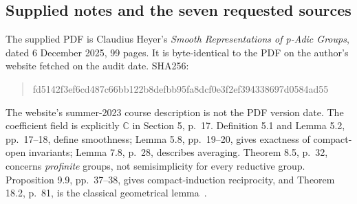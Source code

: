 \documentclass[11pt]{article}
\theoremstyle{remark}\newtheorem{remark}[definition]{Remark}
\newcommand{\C}{\mathbb{C}}
\begin{document}
\subsection{Supplied notes and the seven requested sources}
The supplied PDF is Claudius Heyer's \emph{Smooth Representations of p-Adic
Groups}, dated 6 December 2025, 99 pages. It is byte-identical to the PDF on the
author's website fetched on the audit date. SHA256:
\begin{quote}\small\ttfamily
fd5142f3ef6cd487c66bb122b8defbb95fa8dcf0e3f2ef394338697d0584ad55
\end{quote}
The website's summer-2023 course description is not the PDF version date.
The coefficient field is explicitly $\C$ in Section 5, p.~17.
Definition 5.1 and Lemma 5.2, pp.~17--18, define smoothness;
Lemma 5.8, pp.~19--20, gives exactness of compact-open invariants;
Lemma 7.8, p.~28, describes averaging. Theorem 8.5, p.~32, concerns
\emph{profinite} groups, not semisimplicity for every reductive group.
Proposition 9.9, pp.~37--38, gives compact-induction reciprocity, and
Theorem 18.2, p.~81, is the classical geometrical lemma~\cite{HeyerSmooth2025}.
\end{document}
